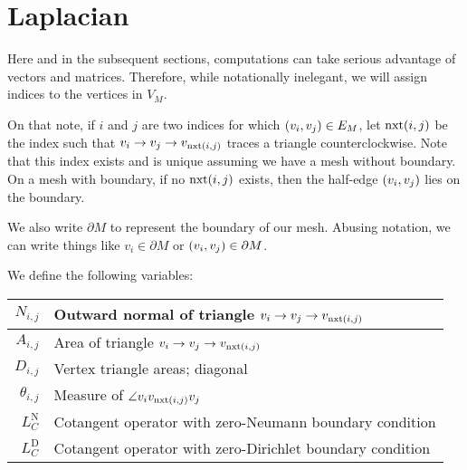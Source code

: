 \section{Laplacian}

Here and in the subsequent sections, computations can take serious advantage of vectors and matrices. Therefore, while notationally inelegant, we will assign indices to the vertices in \(V_M\).

On that note, if \(i\) and \(j\) are two indices for which \(\pof{v_i, v_j} \in E_M\), let \(\nxt\pof{i, j}\) be the index such that \(v_i \to v_j \to v_{\nxt\pof{i, j}}\) traces a triangle counterclockwise. Note that this index exists and is unique assuming we have a mesh without boundary. On a mesh with boundary, if no \(\nxt\pof{i, j}\) exists, then the half-edge \(\pof{v_i, v_j}\) lies on the boundary.

We also write \(\partial M\) to represent the boundary of our mesh. Abusing notation, we can write things like \(v_i \in \partial M\) or \(\pof{v_i, v_j} \in \partial M\).

We define the following variables: \begin{center}\begin{tabular}{r|l}
	\(N_{i, j}\) & Outward normal of triangle \(v_i \to v_j \to v_{\nxt\pof{i, j}}\) \\ \hline
	\(A_{i, j}\) & Area of triangle \(v_i \to v_j \to v_{\nxt\pof{i, j}}\) \\ \hline
	\(D_{i, j}\) & Vertex triangle areas; diagonal \\ \hline
	\(\theta_{i, j}\) & Measure of \(\angle v_iv_{\nxt\pof{i, j}}v_j\) \\ \hline
	\(L_C^{\text{N}}\) & Cotangent operator with zero-Neumann boundary condition \\ \hline
	\(L_C^{\text{D}}\) & Cotangent operator with zero-Dirichlet boundary condition
\end{tabular}\end{center}


